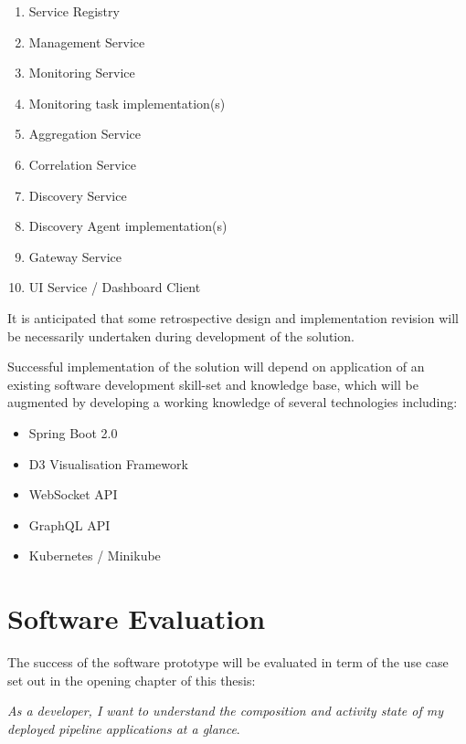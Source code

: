 \begin{enumerate}
	\item Service Registry 
	\item Management Service
	\item Monitoring Service
	\item Monitoring task implementation(s)
	\item Aggregation Service
	\item Correlation Service
	\item Discovery Service
	\item Discovery Agent implementation(s)
	\item Gateway Service
	\item UI Service / Dashboard Client
\end{enumerate}

It is anticipated that some retrospective design and implementation revision will be necessarily undertaken during development of the solution.

Successful implementation of the solution will depend on application of an existing software development skill-set and knowledge base, which will be augmented by developing a working knowledge of several technologies including:

\begin{itemize}
	\item Spring Boot 2.0
	\item D3 Visualisation Framework  
	\item WebSocket API
	\item GraphQL API
	\item Kubernetes / Minikube
\end{itemize}

\section{Software Evaluation}\label{design_evaluation}

The success of the software prototype will be evaluated in term of the use case set out in the opening chapter of this thesis: 

\textit {As a developer, I want to understand the composition and activity state of my deployed pipeline applications at a glance}.


